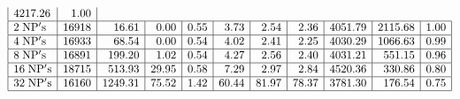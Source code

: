 \documentclass[headrule,landscape]{foils}
\def\blu#1{\textcolor{blue}{#1}}
\newcommand{\foil}[1]{\foilhead[-.6in]{\blu{#1}}}
\begin{document}
{{$$\begin{array}{|l|r|r|r|r|r|r|r|r|r|r|}
4217.26 & 1.00 \\
\hline
{\rm 2\;NP's} & 16918 & 16.61 & 0.00 & 0.55 & 3.73 & 2.54 & 2.36 & 4051.79 &
2115.68 & 1.00  \\
\hline
{\rm 4\;NP's} & 16933 & 68.54 & 0.00 & 0.54 & 4.02 & 2.41 & 2.25 & 4030.29 &
1066.63 & 0.99 \\
\hline
{\rm 8\;NP's} & 16891 & 199.20 & 1.02 & 0.54 & 4.27 & 2.56 & 2.40 & 4031.21 &
551.15 & 0.96 \\
\hline
{\rm 16\;NP's} & 18715 & 513.93 & 29.95 & 0.58 & 7.29 & 2.97 & 2.84 & 4520.36
& 330.86 & 0.80 \\
\hline
{\rm 32\;NP's} & 16160 & 1249.31 & 75.52 & 1.42 & 60.44 & 81.97 & 78.37 &
3781.30 & 176.54 & 0.75 \\
\hline
\end{array}
$$
}
}


\foil{Computational Results: Scalability of SYMPHONY VRP Solver}
\end{document}
